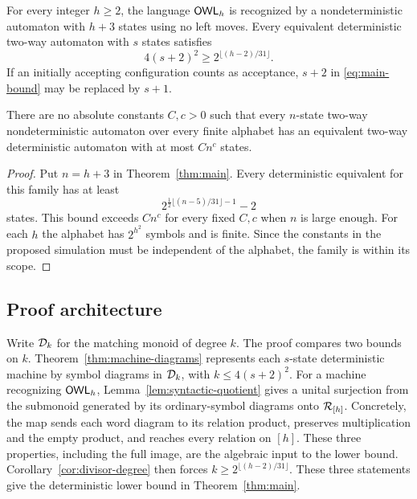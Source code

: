 \begin{theorem}
\label{thm:main}
For every integer $h\ge2$, the language $\mathsf{OWL}_h$ is recognized by a
nondeterministic automaton with $h+3$ states using no left moves. Every
equivalent deterministic two-way automaton with $s$ states satisfies
\begin{equation}
\label{eq:main-bound}
 4(s+2)^2\ge 2^{\lfloor(h-2)/31\rfloor}.
\end{equation}
If an initially accepting configuration counts as acceptance, $s+2$ in
\eqref{eq:main-bound} may be replaced by $s+1$.
\end{theorem}

\begin{corollary}
\label{cor:no-polynomial}
There are no absolute constants $C,c>0$ such that every $n$-state two-way
nondeterministic automaton over every finite alphabet has an equivalent
two-way deterministic automaton with at most $Cn^c$ states.
\end{corollary}

\begin{proof}
Put $n=h+3$ in Theorem~\ref{thm:main}. Every deterministic equivalent
for this family has at least
\[
 2^{\frac12\lfloor(n-5)/31\rfloor-1}-2
\]
states. This bound exceeds $Cn^c$ for every fixed $C,c$ when $n$ is large
enough. For each $h$ the alphabet has $2^{h^2}$ symbols and is finite.
Since the constants in the proposed simulation must be independent of
the alphabet, the family is within its scope.
\end{proof}

\subsection{Proof architecture}

Write $\mathcal D_{k}$ for the matching monoid of degree $k$. The proof compares
two bounds on $k$. Theorem~\ref{thm:machine-diagrams} represents each
$s$-state deterministic machine by symbol diagrams in $\mathcal D_{k}$, with
$k\le4(s+2)^2$. For a machine recognizing $\mathsf{OWL}_h$,
Lemma~\ref{lem:syntactic-quotient} gives a unital surjection from the
submonoid generated by its ordinary-symbol diagrams onto $\mathcal R_{[h]}$.
Concretely, the map sends each word diagram to its relation product,
preserves multiplication and the empty product, and reaches every
relation on $[h]$. These three properties, including the full image,
are the algebraic input to the lower bound.
Corollary~\ref{cor:divisor-degree} then forces
$k\ge2^{\lfloor(h-2)/31\rfloor}$. These three statements give the deterministic
lower bound in Theorem~\ref{thm:main}.

